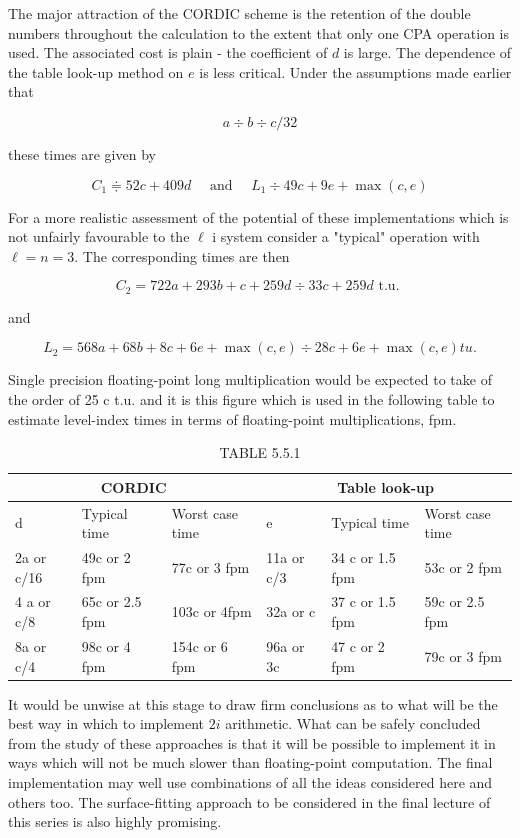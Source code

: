 \documentclass[10pt]{article}
\begin{document}
The major attraction of the CORDIC scheme is the retention of the double numbers throughout the calculation to the extent that only one CPA operation is used. The associated cost is plain - the coefficient of $d$ is large. The dependence of the table look-up method on $e$ is less critical. Under the assumptions made earlier that

$$
a \div b \div c / 32
$$

these times are given by

$$
C_{1} \doteqdot 52 c+409 d \quad \text { and } \quad L_{1} \div 49 c+9 e+\max (c, e)
$$

For a more realistic assessment of the potential of these implementations which is not unfairly favourable to the $\ell$ i system consider a "typical" operation with $\ell=n=3$. The corresponding times are then

$$
C_{2}=722 a+293 b+c+259 d \div 33 c+259 d \text { t.u. }
$$

and

$$
L_{2}=568 a+68 b+8 c+6 e+\max (c, e) \div 28 c+6 e+\max (c, e) t u .
$$

Single precision floating-point long multiplication would be expected to take of the order of 25 c t.u. and it is this figure which is used in the following table to estimate level-index times in terms of floating-point multiplications, fpm.

\begin{table}[h]
\begin{center}
\captionsetup{labelformat=empty}
\caption{TABLE 5.5.1}
\begin{tabular}{|l|l|l|l|l|l|}
\hline
\multicolumn{3}{|c|}{CORDIC} & \multicolumn{3}{|c|}{Table look-up} \\
\hline
d & Typical time & Worst case time & e & Typical time & Worst case time \\
\hline
2a or c/16 & 49c or 2 fpm & 77c or 3 fpm & 11a or c/3 & 34 c or 1.5 fpm & 53c or 2 fpm \\
\hline
4 a or c/8 & 65c or 2.5 fpm & 103c or 4fpm & 32a or c & 37 c or 1.5 fpm & 59c or 2.5 fpm \\
\hline
8a or c/4 & 98c or 4 fpm & 154c or 6 fpm & 96a or 3c & 47 c or 2 fpm & 79c or 3 fpm \\
\hline
\end{tabular}
\end{center}
\end{table}

It would be unwise at this stage to draw firm conclusions as to what will be the best way in which to implement $2 i$ arithmetic. What can be safely concluded from the study of these approaches is that it will be possible to implement it in ways which will not be much slower than floating-point computation. The final implementation may well use combinations of all the ideas considered here and others too. The surface-fitting approach to be considered in the final lecture of this series is also highly promising.
\end{document}
